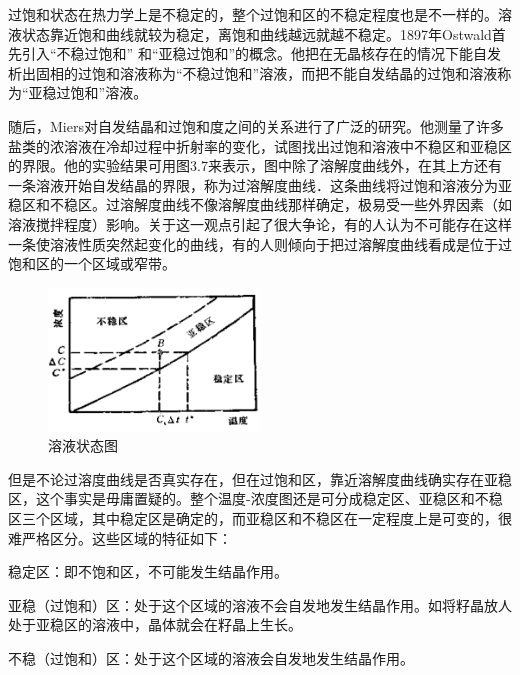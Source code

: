 过饱和状态在热力学上是不稳定的，整个过饱和区的不稳定程度也是不一样的。溶液状态靠近饱和曲线就较为稳定，离饱和曲线越远就越不稳定。1897年Ostwald首先引入“不稳过饱和” 和“亚稳过饱和”的概念。他把在无晶核存在的情况下能自发析出固相的过饱和溶液称为“不稳过饱和”溶液，而把不能自发结晶的过饱和溶液称为“亚稳过饱和”溶液。

随后，Miers对自发结晶和过饱和度之间的关系进行了广泛的研究。他测量了许多盐类的浓溶液在冷却过程中折射率的变化，试图找出过饱和溶液中不稳区和亚稳区的界限。他的实验结果可用图3.7来表示，图中除了溶解度曲线外，在其上方还有一条溶液开始自发结晶的界限，称为过溶解度曲线．这条曲线将过饱和溶液分为亚稳区和不稳区。过溶解度曲线不像溶解度曲线那样确定，极易受一些外界因素（如溶液搅拌程度）影响。关于这一观点引起了很大争论，有的人认为不可能存在这样一条使溶液性质突然起变化的曲线，有的人则倾向于把过溶解度曲线看成是位于过饱和区的一个区域或窄带。

\begin{figure}[htb]
 \centering
 \includegraphics[width=0.5\textwidth]{fig/cp03/img3.7.jpg}
 \caption{溶液状态图}
\end{figure}

但是不论过溶度曲线是否真实存在，但在过饱和区，靠近溶解度曲线确实存在亚稳区，这个事实是毋庸置疑的。整个温度-浓度图还是可分成稳定区、亚稳区和不稳区三个区域，其中稳定区是确定的，而亚稳区和不稳区在一定程度上是可变的，很难严格区分。这些区域的特征如下：

稳定区：即不饱和区，不可能发生结晶作用。

亚稳（过饱和）区：处于这个区域的溶液不会自发地发生结晶作用。如将籽晶放人处于亚稳区的溶液中，晶体就会在籽晶上生长。

不稳（过饱和）区：处于这个区域的溶液会自发地发生结晶作用。

